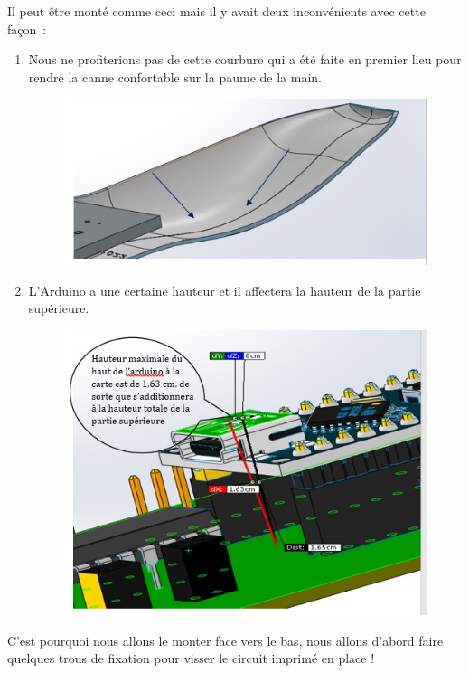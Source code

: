 \FloatBarrier

Il peut être monté comme ceci mais il y avait deux inconvénients avec cette façon :

\begin{enumerate}
    \item Nous ne profiterions pas de cette courbure qui a été faite en premier lieu pour rendre la canne confortable sur la paume de la main.
    \begin{figure}[!htbp]
        \centering
        \includegraphics[width=.6\linewidth]{assets/conception1/13.png}
    \end{figure}
    \FloatBarrier
    \item L’Arduino a une certaine hauteur et il affectera la hauteur de la partie supérieure.
    \begin{figure}[!htbp]
        \centering
        \includegraphics[width=.6\linewidth]{assets/conception1/14.png}
    \end{figure}
    \FloatBarrier
\end{enumerate}

C’est pourquoi nous allons le monter face vers le bas, nous allons d’abord faire quelques trous de fixation pour visser le circuit imprimé en place ! 

